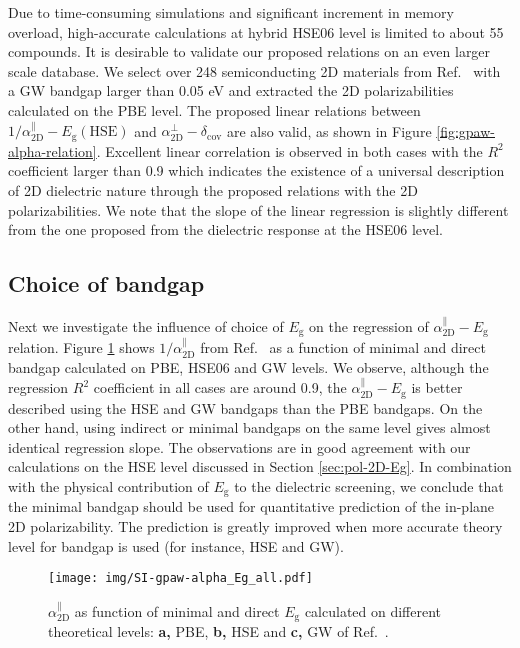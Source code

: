 \documentclass[journal=ancac3,email=true,hyperref=true,keywords=false]{achemso}
\begin{document}
Due to time-consuming simulations and significant increment in 
memory overload, high-accurate calculations at hybrid HSE06 level is limited 
to about 55 compounds. 
It is desirable to validate our proposed
relations on an even larger scale database. We select over 248
semiconducting 2D materials from Ref.~ 
with a GW bandgap
larger than 0.05 eV and extracted the 2D polarizabilities calculated
on the PBE level. The proposed linear relations between
$1/\alpha_{\mathrm{2D}}^{\parallel}-E_{\mathrm{g}}(\mathrm{HSE})$ and
$\alpha_{\mathrm{2D}}^{\perp}-\delta_{\mathrm{cov}}$ are also valid,
as shown in Figure \ref{fig:gpaw-alpha-relation}. Excellent linear
correlation is observed in both cases with the $R^{2}$ coefficient
larger than 0.9 which indicates the existence of a universal description 
of 2D dielectric nature through the proposed relations with the 2D
polarizabilities. We note that the slope of the linear regression is
slightly different from the one proposed from the dielectric
response at the HSE06 level. 

\subsection{Choice of bandgap}
\label{sec:gpaw-2}

Next we investigate the influence of choice of $E_{\mathrm{g}}$ on the
regression of $\alpha_{\mathrm{2D}}^{\parallel}-E_{\mathrm{g}}$ relation. Figure
\ref{fig:SI-gpaw-alpha-Eg-all} shows $1/\alpha_{\mathrm{2D}}^{\parallel}$ from 
Ref.~ as a function of minimal and direct bandgap calculated
on PBE, HSE06 and GW levels. We observe,
although the regression $R^{2}$ coefficient in all cases are around
0.9, the $\alpha_{\mathrm{2D}}^{\parallel}-E_{\mathrm{g}}$ is better described using
the HSE and GW bandgaps than the PBE bandgaps. On the other hand,
using indirect or minimal bandgaps on the same level gives almost
identical regression slope. The observations are in good agreement
with our calculations on the HSE level discussed in Section
\ref{sec:pol-2D-Eg}. In combination with the physical contribution of
$E_{\mathrm{g}}$ to the dielectric screening, we conclude that the
minimal bandgap should be used for quantitative prediction of the
in-plane 2D polarizability. The prediction is greatly improved when
more accurate theory level for bandgap is used (for instance, HSE and GW).

\begin{figure}[htbp]
  \centering
  \texttt{[image: img/SI-gpaw-alpha\_Eg\_all.pdf]}
  \caption{$\alpha_{\mathrm{2D}}^{\parallel}$ as function of minimal and direct
    $E_{\mathrm{g}}$ calculated on different theoretical levels:
    \textbf{a,} PBE, \textbf{b,} HSE and \textbf{c,} GW of Ref.~.}
  \label{fig:SI-gpaw-alpha-Eg-all}
\end{figure}
\end{document}
